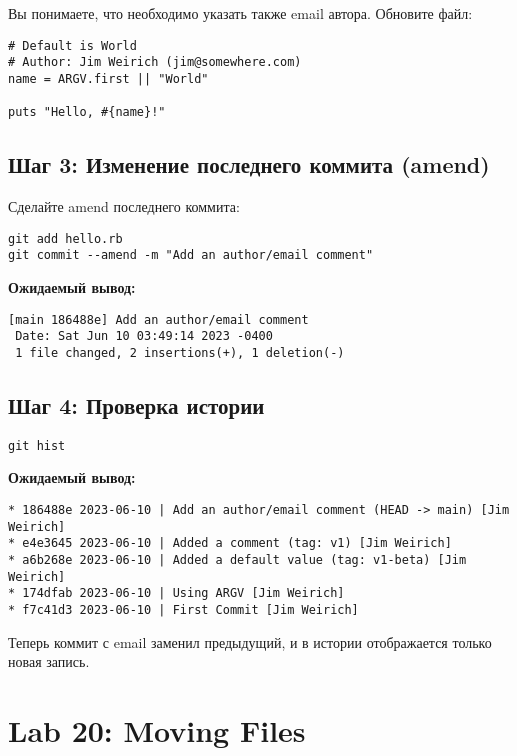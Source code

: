 \documentclass[a4paper,12pt]{report}
\begin{document}
Вы понимаете, что необходимо указать также email автора. Обновите файл:
\begin{verbatim}
# Default is World
# Author: Jim Weirich (jim@somewhere.com)
name = ARGV.first || "World"

puts "Hello, #{name}!"
\end{verbatim}

\subsection*{Шаг 3: Изменение последнего коммита (amend)}

Сделайте amend последнего коммита:
\begin{verbatim}
git add hello.rb
git commit --amend -m "Add an author/email comment"
\end{verbatim}

\textbf{Ожидаемый вывод:}
\begin{verbatim}
[main 186488e] Add an author/email comment
 Date: Sat Jun 10 03:49:14 2023 -0400
 1 file changed, 2 insertions(+), 1 deletion(-)
\end{verbatim}

\subsection*{Шаг 4: Проверка истории}
\begin{verbatim}
git hist
\end{verbatim}

\textbf{Ожидаемый вывод:}
\begin{verbatim}
* 186488e 2023-06-10 | Add an author/email comment (HEAD -> main) [Jim Weirich]
* e4e3645 2023-06-10 | Added a comment (tag: v1) [Jim Weirich]
* a6b268e 2023-06-10 | Added a default value (tag: v1-beta) [Jim Weirich]
* 174dfab 2023-06-10 | Using ARGV [Jim Weirich]
* f7c41d3 2023-06-10 | First Commit [Jim Weirich]
\end{verbatim}

Теперь коммит с email заменил предыдущий, и в истории отображается только новая запись.


\section{Lab 20: Moving Files}
\end{document}
